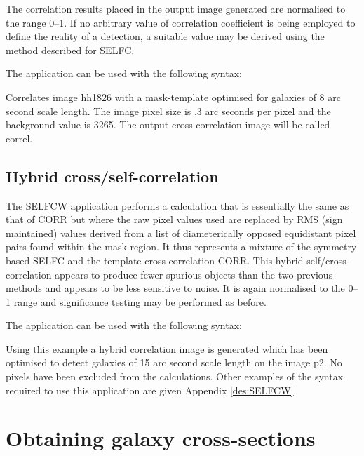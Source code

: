 \documentclass[twoside,11pt]{starlink}
\begin{document}
The correlation results placed in the output image generated are
normalised to the range 0--1. If no arbitrary value
of correlation coefficient is being employed to define the reality of a detection,
a suitable value may be derived using the method described for SELFC.

The application can be used with the following syntax:

\begin{terminalv}
\end{terminalv}

Correlates image hh1826 with a mask-template optimised for galaxies of
8 arc second scale length. The image pixel size is .3 arc seconds
per pixel and the background value is 3265. The
output cross-correlation image will be called correl.

\subsection{Hybrid cross/self-correlation}

The SELFCW application performs a calculation that is essentially the same
as that of CORR but where the raw pixel values used are replaced by RMS
(sign maintained) values derived from a list of diameterically opposed
equidistant pixel pairs found within the mask region. It thus
represents a mixture of the symmetry based SELFC and the template
cross-correlation CORR. This hybrid self/cross-correlation appears
to produce fewer spurious objects than the two previous methods and
appears to be less sensitive to noise. It is again normalised to the
0--1 range and significance testing may be performed as
before.

The application can be used with the following syntax:

\begin{terminalv}
\end{terminalv}

Using this example a hybrid correlation image is generated which has been
optimised to detect galaxies of 15 arc second scale length on the
image p2. No pixels have been excluded from the calculations.
Other examples of the syntax required to use this application are given
Appendix \ref{des:SELFCW}.


\section{Obtaining galaxy cross-sections}
\label{sec:obtaining}
\end{document}
